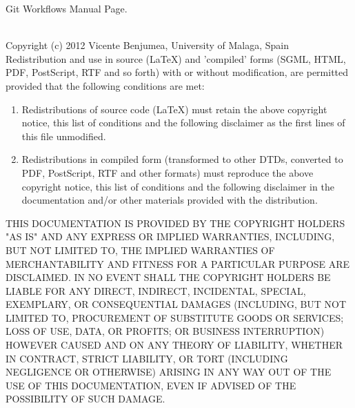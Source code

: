 \documentclass[a4paper]{article}
\begin{document}
\begin{thebibliography}{10}
\newblock  Git Workflows Manual Page.
\end{thebibliography}
\vspace*{\fill}\noindent
\begin{minipage}{\linewidth}\footnotesize
\hrulefill\\
\noindent
Copyright (c)  2012  Vicente Benjumea, University of Malaga, Spain\\

\noindent
Redistribution and use in source (LaTeX) and 'compiled' forms
(SGML, HTML, PDF, PostScript, RTF and so forth) with or without
modification, are permitted provided that the following conditions are
met:
\begin{enumerate}
\item Redistributions of source code (LaTeX) must retain the
      above copyright notice, this list of conditions and the
      following disclaimer as the first lines of this file unmodified.

\item Redistributions in compiled form (transformed to other DTDs,
      converted to PDF, PostScript, RTF and other formats) must
      reproduce the above copyright notice, this list of conditions
      and the following disclaimer in the documentation and/or other
      materials provided with the distribution.
\end{enumerate}
THIS DOCUMENTATION IS PROVIDED BY THE COPYRIGHT HOLDERS "AS IS" AND
ANY EXPRESS OR IMPLIED WARRANTIES, INCLUDING, BUT NOT LIMITED TO, THE
IMPLIED WARRANTIES OF MERCHANTABILITY AND FITNESS FOR A PARTICULAR
PURPOSE ARE DISCLAIMED. IN NO EVENT SHALL THE COPYRIGHT HOLDERS BE
LIABLE FOR ANY DIRECT, INDIRECT, INCIDENTAL, SPECIAL, EXEMPLARY, OR
CONSEQUENTIAL DAMAGES (INCLUDING, BUT NOT LIMITED TO, PROCUREMENT OF
SUBSTITUTE GOODS OR SERVICES; LOSS OF USE, DATA, OR PROFITS; OR
BUSINESS INTERRUPTION) HOWEVER CAUSED AND ON ANY THEORY OF LIABILITY,
WHETHER IN CONTRACT, STRICT LIABILITY, OR TORT (INCLUDING NEGLIGENCE
OR OTHERWISE) ARISING IN ANY WAY OUT OF THE USE OF THIS DOCUMENTATION,
EVEN IF ADVISED OF THE POSSIBILITY OF SUCH DAMAGE.
\end{minipage}


\end{document}

